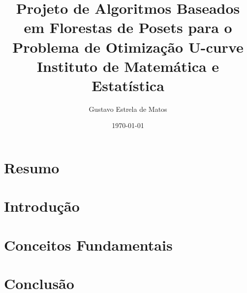 \documentclass[12pt, twoside]{report}
\title{
    {Projeto de Algoritmos Baseados em Florestas de Posets para o 
     Problema de Otimização U-curve} \\
    {\large Instituto de Matemática e Estatística} \\
}
\author{Gustavo Estrela de Matos}
\date{\today}
\numberwithin{mydefinition}{section}
\begin{document}
\maketitle

\chapter*{Resumo}

\tableofcontents

\nocite{*}
\chapter{Introdução}


\chapter{Conceitos Fundamentais}


\chapter{Conclusão}


\newpage
\printbibliography
\end{document}
